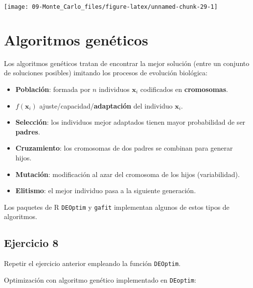 \documentclass[]{book}
\theoremstyle{definition}
\theoremstyle{definition}
\theoremstyle{definition}
\theoremstyle{remark}
\begin{document}
\begin{center}\texttt{[image: 09-Monte\_Carlo\_files/figure-latex/unnamed-chunk-29-1]} \end{center}

\section{Algoritmos genéticos}\label{algoritmos-geneticos}

Los algoritmos genéticos tratan de encontrar la mejor solución (entre un
conjunto de soluciones posibles) imitando los procesos de evolución
biológica:

\begin{itemize}
\item
  \textbf{Población}: formada por \(n\) individuos \(\mathbf{x}_{i}\)
  codificados en \textbf{cromosomas}.
\item
  \(f(\mathbf{x}_{i})\) ajuste/capacidad/\textbf{adaptación} del
  individuo \(\mathbf{x}_{i}\).
\item
  \textbf{Selección}: los individuos mejor adaptados tienen mayor
  probabilidad de ser \textbf{padres}.
\item
  \textbf{Cruzamiento}: los cromosomas de dos padres se combinan para
  generar hijos.
\item
  \textbf{Mutación}: modificación al azar del cromosoma de los hijos
  (variabilidad).
\item
  \textbf{Elitismo}: el mejor individuo pasa a la siguiente generación.
\end{itemize}

Los paquetes de R \texttt{DEOptim} y \texttt{gafit} implementan algunos
de estos tipos de algoritmos.

\subsection{Ejercicio 8}\label{ejercicio-8}

Repetir el ejercicio anterior empleando la función \texttt{DEOptim}.

Optimización con algoritmo genético implementado en \texttt{DEoptim}:
\end{document}
